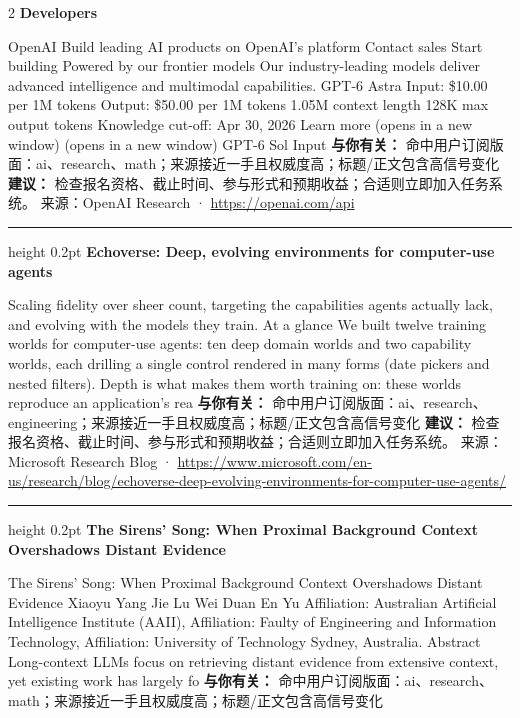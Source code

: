 \documentclass[10.5pt]{ctexart}
\begin{document}
\begin{multicols}{2}
{\large\bfseries Developers}\par
OpenAI Build leading AI products on OpenAI’s platform Contact sales Start building Powered by our frontier models Our industry-leading models deliver advanced intelligence and multimodal capabilities. GPT-6 Astra Input: \$10.00 per 1M tokens Output: \$50.00 per 1M tokens 1.05M context length 128K max output tokens Knowledge cut-off: Apr 30, 2026 Learn more (opens in a new window) (opens in a new window) GPT-6 Sol Input
\textbf{与你有关：} 命中用户订阅版面：ai、research、math；来源接近一手且权威度高；标题/正文包含高信号变化
\textbf{建议：} 检查报名资格、截止时间、参与形式和预期收益；合适则立即加入任务系统。
{\footnotesize\color{ormuted} 来源：OpenAI Research · \url{https://openai.com/api}}
\vspace{2mm}
\hrule height 0.2pt
\vspace{2mm}
{\large\bfseries Echoverse: Deep, evolving environments for computer-use agents}\par
Scaling fidelity over sheer count, targeting the capabilities agents actually lack, and evolving with the models they train. At a glance We built twelve training worlds for computer-use agents: ten deep domain worlds and two capability worlds, each drilling a single control rendered in many forms (date pickers and nested filters). Depth is what makes them worth training on: these worlds reproduce an application’s rea
\textbf{与你有关：} 命中用户订阅版面：ai、research、engineering；来源接近一手且权威度高；标题/正文包含高信号变化
\textbf{建议：} 检查报名资格、截止时间、参与形式和预期收益；合适则立即加入任务系统。
{\footnotesize\color{ormuted} 来源：Microsoft Research Blog · \url{https://www.microsoft.com/en-us/research/blog/echoverse-deep-evolving-environments-for-computer-use-agents/}}
\vspace{2mm}
\hrule height 0.2pt
\vspace{2mm}
{\large\bfseries The Sirens’ Song: When Proximal Background Context Overshadows Distant Evidence}\par
The Sirens’ Song: When Proximal Background Context Overshadows Distant Evidence Xiaoyu Yang Jie Lu Wei Duan En Yu Affiliation: Australian Artificial Intelligence Institute (AAII), Affiliation: Faulty of Engineering and Information Technology, Affiliation: University of Technology Sydney, Australia. Abstract Long-context LLMs focus on retrieving distant evidence from extensive context, yet existing work has largely fo
\textbf{与你有关：} 命中用户订阅版面：ai、research、math；来源接近一手且权威度高；标题/正文包含高信号变化

\end{multicols}
\end{document}
